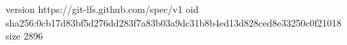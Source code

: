 version https://git-lfs.github.com/spec/v1
oid sha256:0cb17d83bf5d276dd283f7a83b03a9dc31b8b4ed13d828ced8e33250c0f21018
size 2896
